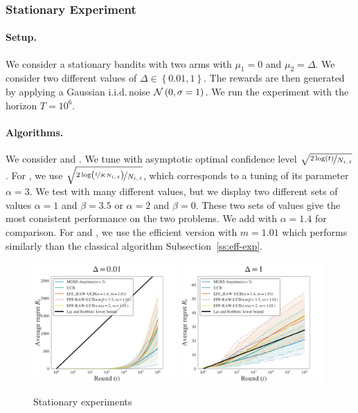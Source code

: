 \subsubsection{Stationary Experiment}

\paragraph{Setup.} We consider a stationary bandits with two arms with $\mu_1= 0$ and $\mu_2 = \Delta$. We consider two different values of $\Delta \in \left\{0.01, 1\right\}$. The rewards are then generated by applying a Gaussian i.i.d.\,noise $\mathcal{N}\left(0,\sigma = 1\right)$. We run the experiment with the horizon $T=10^6$.

\paragraph{Algorithms.} We consider \UCB and \MOSSa \citep{degenne2016anytime}. We tune \UCB with asymptotic optimal confidence level $\sqrt{\nicefrac{2\log\left(t\right)}{N_{i,\,t}}}$ \citep{lattimore2020banditbook}. For \MOSSa, we use $\sqrt{\nicefrac{2\log\left(\nicefrac{t}{KN_{i,\,t}}\right)}{N_{i,\,t}}}$, which corresponds to a tuning of its parameter $\alpha = 3$. We test \RAWUCBpp with many different values, but we display two different sets of values $\alpha = 1$ and $\beta = 3.5$ or $\alpha = 2$ and $\beta=0$. These two sets of values give the most consistent performance on the two problems. We add \RAWUCB with $\alpha = 1.4$ for comparison. For \RAWUCB and \RAWUCBpp , we use the efficient version with $m=1.01$ which performs similarly than the classical algorithm Subsection~\ref{ss:eff-exp}.

\begin{figure}[ht]
\centering
\includegraphics[clip, width= 0.49\textwidth]{3Rested/fig/fig_asy0,01.pdf}
\includegraphics[clip, width= 0.49\textwidth]{3Rested/fig/fig_asy1.pdf}
\caption{Stationary experiments}
\label{fig:stationary-experiment}
\end{figure}
